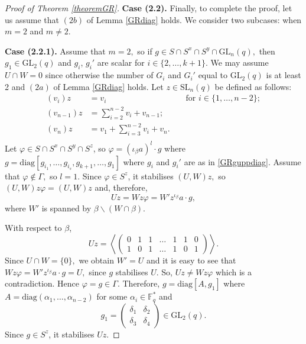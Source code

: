 \documentclass[a4paper,reqno,11pt]{amsart}
\theoremstyle{definition}
\theoremstyle{remark}
\numberwithin{equation}{section}
\newcommand{\diag}{\mathrm{diag}}
\newcommand{\SL}{{\mathrm{SL}}}
\newcommand{\GL}{{\mathrm{GL}}}
\begin{document}
\begin{proof}[Proof of Theorem {\rm \ref{theoremGR}}]
\bigskip

{\bf Case (2.2).} Finally, to complete the proof, let us assume that $(2b)$ of Lemma \ref{GRdiag} holds. We consider two subcases: when $m=2$ and $m \ne 2$.

\medskip

{\bf Case (2.2.1).} Assume that $m=2,$ so if $g \in S \cap S^x \cap S^y \cap \GL_n(q),$ then $g_1 \in \GL_2(q)$ and $g_i$, $g_i'$ are scalar for $i \in \{2, \ldots, k+1\}.$ We may assume $U \cap W=0$ since otherwise the number of $G_i$ and $G_i'$ equal to $\GL_2(q)$ is at least 2 and $(2a)$  of Lemma \ref{GRdiag} holds. Let $z \in \SL_n(q)$ be defined as follows:
\begin{equation}
\label{GRzdefcase221}
\begin{aligned}
(v_i)z & =  v_i &&\text{ for } i \in \{1, \ldots, n-2\}; \\
(v_{n-1})z & =  \sum_{i=2}^{n-2} v_i + v_{n-1};\\
(v_{n})z & =  v_1+ \sum_{i=3}^{n-2} v_i   + v_{n}.\\
\end{aligned} 
\end{equation}
Let $\varphi \in S \cap S^x \cap S^y \cap S^z$, so $\varphi= (\iota_{\beta}a)^l \cdot g$ where $g=\diag[g_{i_1},\ldots, g_{i_s}, g_{k+1}, \ldots, g_1]$ where $g_i$ and $g_i'$ are as in \eqref{GRguppdiag}.  
 Assume that $\varphi \notin \Gamma,$ so $l=1.$ Since $\varphi \in S^z$, it stabilises $(U,W)z,$ so $(U,W)z \varphi =(U,W)z$ and, therefore, 
$$Uz=Wz \varphi = W'z^{\iota_{\beta}}a \cdot g,$$
where $W'$ is spanned by $\beta \backslash (W \cap \beta).$  

 With respect to $\beta$,
$$Uz= \left \langle 
\left(\begin{array}{ccccc|cc}
0  & 1& 1 & \ldots & 1   &           1 &0  \\
1  & 0& 1     & \ldots & 1       &    0       & 1 
\end{array}\right)
\right \rangle.$$
 Since $U \cap W=\{0\},$ we obtain $W'=U$ and it is easy to see that $Wz \varphi = W'z^{\iota_{\beta}}a\cdot g= U,$ since $g$ stabilises $U$. So, $Uz \ne Wz \varphi$ which is a contradiction. Hence $\varphi =g\in \Gamma.$ Therefore, $g=\diag[A,g_1]$ where $A=\diag(\alpha_1, \ldots, \alpha_{n-2})$ for some $\alpha_i \in \mathbb{F}_q^*$ and $$g_1 = \left( \begin{matrix} \delta_1 & \delta_2 \\ \delta_3 & \delta_4  \end{matrix} \right) \in \GL_2(q).$$ Since $g \in S^z$, it stabilises $Uz.$
 

\end{proof}
\end{document}
